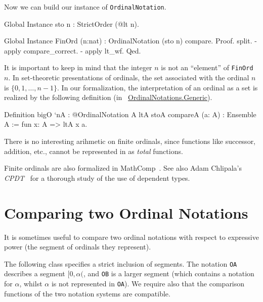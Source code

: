 Now we can build our instance of \texttt{OrdinalNotation}.

\begin{Coqsrc}
Global Instance sto n : StrictOrder (@lt n).

Global Instance FinOrd (n:nat) : OrdinalNotation (sto n) compare.
Proof.
  split.
  - apply compare_correct.
  - apply lt_wf.
Qed.
\end{Coqsrc}

\begin{remark}
It is important to keep in mind  that the integer $n$ is not an ``element'' of \texttt{FinOrd $n$}. In set-theoretic presentations of ordinals, the set associated with the ordinal $n$ is $\{0,1,\dots,n-1\}$. 
In our formalization, the interpretation of an ordinal as a set is realized by the following definition
(in ~\href{../theories/html/hydras.OrdinalNotations.Generic.html}{OrdinalNotations.Generic}).

\begin{Coqsrc}
Definition bigO `{nA : @OrdinalNotation A ltA stoA compareA}
           (a: A) : Ensemble A :=
  fun x: A => ltA x a.
\end{Coqsrc}
\end{remark}


\begin{remark}
 There is no interesting arihmetic on finite ordinals, since functions like successor, addition, etc.,  cannot be represented in \coq{} as \emph{total} functions.
\end{remark}

\begin{remark}
Finite ordinals are also formalized in MathComp~\cite{SSR}.  See also Adam Chlipala's \emph{CPDT}~\cite{chlipalacpdt2011} for a thorough study of the use of dependent types.  
\end{remark}




\section{Comparing two Ordinal Notations}

It is sometimes useful to compare two ordinal notations with respect to expressive power
(the segment of ordinals  they represent). 

The following class specifies a strict inclusion of segments. The notation \texttt{OA} describes a segment $[0,\alpha($, and \texttt{OB} is a larger segment (which contains a notation for $\alpha$, whilst $\alpha$ is not represented in \texttt{OA}). We require also  that the comparison functions of the two notation systems are compatible.

